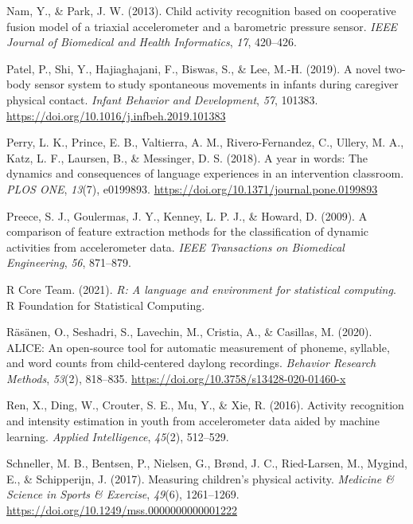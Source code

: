 \documentclass[
  man]{apa6}
\newlength{\cslhangindent}
\newlength{\cslentryspacingunit} %
\newenvironment{CSLReferences}[2] %
 {%
  \setlength{\parindent}{0pt}
  \ifodd #1
  \let\oldpar\par
  \def\par{\hangindent=\cslhangindent\oldpar}
  \fi
  \setlength{\parskip}{#2\cslentryspacingunit}
 }%
 {}
\begin{document}
\begin{CSLReferences}{1}{0}
\leavevmode{}%
Nam, Y., \& Park, J. W. (2013). Child activity recognition based on cooperative fusion model of a triaxial accelerometer and a barometric pressure sensor. \emph{IEEE Journal of Biomedical and Health Informatics}, \emph{17}, 420--426.

\leavevmode{}%
Patel, P., Shi, Y., Hajiaghajani, F., Biswas, S., \& Lee, M.-H. (2019). A novel two-body sensor system to study spontaneous movements in infants during caregiver physical contact. \emph{Infant Behavior and Development}, \emph{57}, 101383. \url{https://doi.org/10.1016/j.infbeh.2019.101383}

\leavevmode{}%
Perry, L. K., Prince, E. B., Valtierra, A. M., Rivero-Fernandez, C., Ullery, M. A., Katz, L. F., Laursen, B., \& Messinger, D. S. (2018). A year in words: The dynamics and consequences of language experiences in an intervention classroom. \emph{{PLOS} {ONE}}, \emph{13}(7), e0199893. \url{https://doi.org/10.1371/journal.pone.0199893}

\leavevmode{}%
Preece, S. J., Goulermas, J. Y., Kenney, L. P. J., \& Howard, D. (2009). A comparison of feature extraction methods for the classification of dynamic activities from accelerometer data. \emph{IEEE Transactions on Biomedical Engineering}, \emph{56}, 871--879.

\leavevmode{}%
R Core Team. (2021). \emph{R: A language and environment for statistical computing}. {R Foundation for Statistical Computing}.

\leavevmode{}%
Räsänen, O., Seshadri, S., Lavechin, M., Cristia, A., \& Casillas, M. (2020). {ALICE}: An open-source tool for automatic measurement of phoneme, syllable, and word counts from child-centered daylong recordings. \emph{Behavior Research Methods}, \emph{53}(2), 818--835. \url{https://doi.org/10.3758/s13428-020-01460-x}

\leavevmode{}%
Ren, X., Ding, W., Crouter, S. E., Mu, Y., \& Xie, R. (2016). Activity recognition and intensity estimation in youth from accelerometer data aided by machine learning. \emph{Applied Intelligence}, \emph{45}(2), 512--529.

\leavevmode{}%
Schneller, M. B., Bentsen, P., Nielsen, G., Brønd, J. C., Ried-Larsen, M., Mygind, E., \& Schipperijn, J. (2017). Measuring children's physical activity. \emph{Medicine \& Science in Sports \& Exercise}, \emph{49}(6), 1261--1269. \url{https://doi.org/10.1249/mss.0000000000001222}


\end{CSLReferences}
\end{document}
